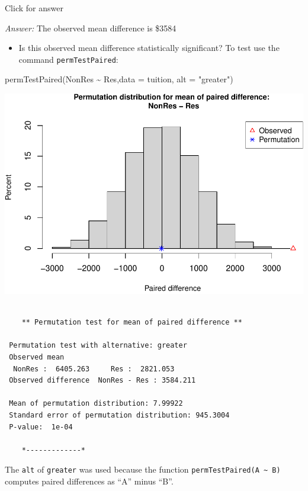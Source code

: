 \documentclass[
]{book}
\newenvironment{Shaded}{\begin{snugshade}}{\end{snugshade}}
\newcommand{\AttributeTok}[1]{\textcolor[rgb]{0.77,0.63,0.00}{#1}}
\newcommand{\FunctionTok}[1]{\textcolor[rgb]{0.00,0.00,0.00}{#1}}
\newcommand{\NormalTok}[1]{#1}
\newcommand{\SpecialCharTok}[1]{\textcolor[rgb]{0.00,0.00,0.00}{#1}}
\newcommand{\StringTok}[1]{\textcolor[rgb]{0.31,0.60,0.02}{#1}}
\providecommand{\tightlist}{%
  \setlength{\itemsep}{0pt}\setlength{\parskip}{0pt}}
\begin{document}
Click for answer

\emph{Answer:} The observed mean difference is \$3584

\begin{itemize}
\tightlist
\item
  Is this observed mean difference statistically significant? To test use the command \texttt{permTestPaired}:
\end{itemize}

\begin{Shaded}
\begin{Highlighting}[]
\FunctionTok{permTestPaired}\NormalTok{(NonRes }\SpecialCharTok{\textasciitilde{}}\NormalTok{ Res,}\AttributeTok{data =}\NormalTok{ tuition, }\AttributeTok{alt =} \StringTok{"greater"}\NormalTok{)}
\end{Highlighting}
\end{Shaded}

\includegraphics[width=1\linewidth]{Class_Activity_13_files/figure-latex/unnamed-chunk-5-1}

\begin{verbatim}

    ** Permutation test for mean of paired difference **

 Permutation test with alternative: greater 
 Observed mean
  NonRes :  6405.263     Res :  2821.053 
 Observed difference  NonRes - Res : 3584.211 

 Mean of permutation distribution: 7.99922 
 Standard error of permutation distribution: 945.3004 
 P-value:  1e-04 

    *-------------*
\end{verbatim}

The \texttt{alt} of \texttt{greater} was used because the function \texttt{permTestPaired(A\ \textasciitilde{}\ B)} computes paired differences as ``A'' minus ``B''.
\end{document}
